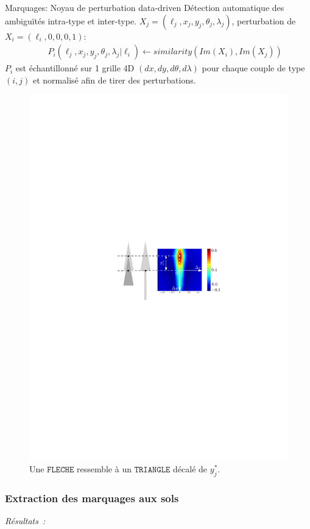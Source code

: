 \documentclass{beamer}
\begin{document}
\begin{frame}{Marquages: Noyau de perturbation data-driven}
Détection automatique des ambiguïtés intra-type et inter-type.
$X_j=(\ell_j,x_j,y_j,\theta_j,\lambda_j)$, perturbation de $X_i=(\ell_i,0,0,0,1)$:
\begin{eqnarray}
\nonumber && P_i(\ell_j,x_j,y_j,\theta_j,\lambda_j | \ell_i) \leftarrow similarity(Im(X_i),Im(X_j))
\end{eqnarray} 
$P_i$ est échantillonné sur 1 grille 4D $(dx,dy,d\theta,d\lambda)$ pour chaque couple de type $(i,j)$ et normalisé afin de tirer des perturbations. 
\begin{figure}
\centering
\includegraphics[width = 0.7\linewidth]{correlation_f_t}
\caption{Une $\texttt{FLECHE}$ ressemble à un $\texttt{TRIANGLE}$ décalé de $y_j^*$.}
\end{figure}
\end{frame}

\begin{frame}
\frametitle{Extraction des marquages aux sols}
\emph{R\'esultats~:}
\begin{center}
\end{center}
\end{frame}
\end{document}
